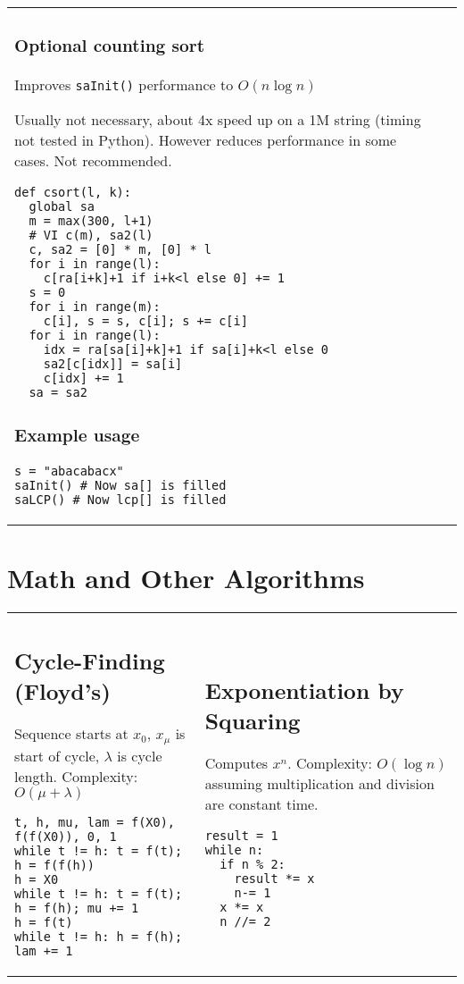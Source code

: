 \documentclass[letterpaper]{article}
\begin{document}
\begin{tabular}{@{}p{9cm}p{9cm}@{}}
    \subsubsection{Optional counting sort}
    Improves \texttt{saInit()} performance to $O\left(n\log n\right)$

    Usually not necessary, about 4x speed up on a 1M string (timing not tested in
    Python). However reduces performance in some cases. Not recommended.
    \begin{lstlisting}
def csort(l, k):
  global sa
  m = max(300, l+1)
  # VI c(m), sa2(l)
  c, sa2 = [0] * m, [0] * l
  for i in range(l):
    c[ra[i+k]+1 if i+k<l else 0] += 1
  s = 0
  for i in range(m):
    c[i], s = s, c[i]; s += c[i]
  for i in range(l):
    idx = ra[sa[i]+k]+1 if sa[i]+k<l else 0
    sa2[c[idx]] = sa[i]
    c[idx] += 1
  sa = sa2
\end{lstlisting}
    \subsubsection{Example usage}

    \begin{lstlisting}
s = "abacabacx"
saInit() # Now sa[] is filled
saLCP() # Now lcp[] is filled
\end{lstlisting}
\end{tabular}

\clearpage

\section{Math and Other Algorithms}

\begin{tabular}{@{}p{9cm}p{9cm}@{}}
    \subsection{Cycle-Finding (Floyd's)}

    Sequence starts at $x_0$, $x_\mu$ is start of cycle, $\lambda$ is cycle length. Complexity: $O\left(\mu+\lambda\right)$

    \begin{lstlisting}
t, h, mu, lam = f(X0), f(f(X0)), 0, 1
while t != h: t = f(t); h = f(f(h))
h = X0
while t != h: t = f(t); h = f(h); mu += 1
h = f(t)
while t != h: h = f(h); lam += 1
\end{lstlisting}
     &
    \subsection{Exponentiation by Squaring}

    Computes $x^n$. Complexity: $O\left(\log n\right)$ assuming multiplication and division are constant time.

    \begin{lstlisting}
result = 1
while n:
  if n % 2:
    result *= x
    n-= 1
  x *= x
  n //= 2
\end{lstlisting}
\end{tabular}
\end{document}
